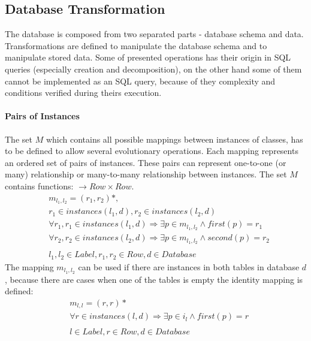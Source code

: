 \documentclass[11pt]{article}
\begin{document}
\subsection{Database Transformation}
The database is composed from two separated parts - database schema and data. Transformations are defined to manipulate the database schema and to manipulate stored data. Some of presented operations has their origin in SQL queries (especially creation and decomposition), on the other hand some of them cannot be implemented as an SQL query, because of they complexity and conditions verified during theirs execution.

\paragraph{Pairs of Instances} The set $M$ which contains all possible mappings between instances of classes, has to be defined to allow several evolutionary operations. Each mapping represents an ordered set of pairs of instances. These pairs can represent one-to-one (or many) relationship or many-to-many relationship between instances. The set $M$ contains functions: $\rightarrow Row \times Row$.
\begin{align*}
&	m_{l_1, l_2} =  (r_1, r_2)*,\\
& 	r_1 \in instances(l_1, d), r_2 \in instances(l_2, d) \\
&	\forall r_1, r_1 \in instances(l_1, d) \Rightarrow \exists p \in m_{l_1, l_2} \wedge first(p) = r_1 \\
&	\forall r_2, r_2 \in instances(l_2, d) \Rightarrow \exists p \in m_{l_1, l_2} \wedge second(p) = r_2\\\\
&	l_1, l_2 \in Label, r_1, r_2 \in Row, d \in Database
\end{align*}
The mapping $m_{l_1, l_2}$ can be used if there are instances in both tables in database $d$, because there are cases when one of the tables is empty the identity mapping is defined:
\begin{align*}
&	m_{l, l} = (r, r) * \\
& 	\forall r \in instances(l, d) \Rightarrow \exists p \in i_{l} \wedge first(p) = r \\\\
&	l \in Label, r \in Row,  d \in Database
\end{align*}
\end{document}
